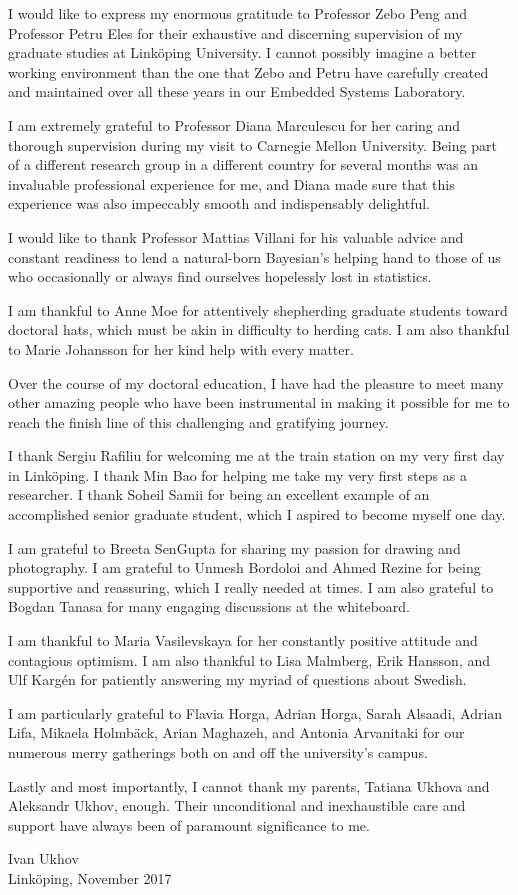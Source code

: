 I would like to express my enormous gratitude to Professor Zebo Peng and
Professor Petru Eles for their exhaustive and discerning supervision of my
graduate studies at Linköping University. I cannot possibly imagine a better
working environment than the one that Zebo and Petru have carefully created and
maintained over all these years in our Embedded Systems Laboratory.

I am extremely grateful to Professor Diana Marculescu for her caring and
thorough supervision during my visit to Carnegie Mellon University. Being part
of a different research group in a different country for several months was an
invaluable professional experience for me, and Diana made sure that this
experience was also impeccably smooth and indispensably delightful.

I would like to thank Professor Mattias Villani for his valuable advice and
constant readiness to lend a natural-born Bayesian's helping hand to those of us
who occasionally or always find ourselves hopelessly lost in statistics.

I am thankful to Anne Moe for attentively shepherding graduate students toward
doctoral hats, which must be akin in difficulty to herding cats. I am also
thankful to Marie Johansson for her kind help with every matter.

Over the course of my doctoral education, I have had the pleasure to meet many
other amazing people who have been instrumental in making it possible for me to
reach the finish line of this challenging and gratifying journey.

I thank Sergiu Rafiliu for welcoming me at the train station on my very first
day in Linköping. I thank Min Bao for helping me take my very first steps as a
researcher. I thank Soheil Samii for being an excellent example of an
accomplished senior graduate student, which I aspired to become myself one day.

I am grateful to Breeta SenGupta for sharing my passion for drawing and
photography. I am grateful to Unmesh Bordoloi and Ahmed Rezine for being
supportive and reassuring, which I really needed at times. I am also grateful to
Bogdan Tanasa for many engaging discussions at the whiteboard.

I am thankful to Maria Vasilevskaya for her constantly positive attitude and
contagious optimism. I am also thankful to Lisa Malmberg, Erik Hansson, and Ulf
Kargén for patiently answering my myriad of questions about Swedish.

I am particularly grateful to Flavia Horga, Adrian Horga, Sarah Alsaadi, Adrian
Lifa, Mikaela Holmbäck, Arian Maghazeh, and Antonia Arvanitaki for our numerous
merry gatherings both on and off the university's campus.

Lastly and most importantly, I cannot thank my parents, Tatiana Ukhova and
Aleksandr Ukhov, enough. Their unconditional and inexhaustible care and support
have always been of paramount significance to me.

\vspace{4em}
\hfill
\noindent
\begin{minipage}{0.36\textwidth}
  Ivan Ukhov\\
  Linköping, November 2017
\end{minipage}
